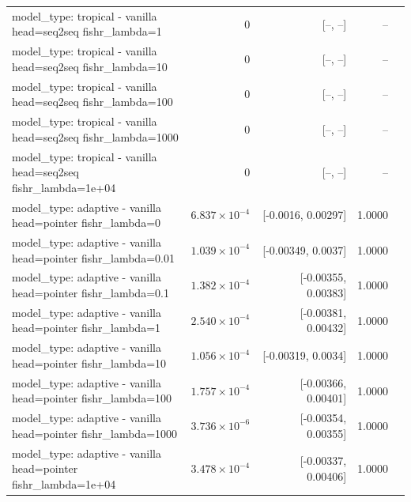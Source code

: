 \documentclass[10pt]{article}
\makeatletter
\newcommand{\stackcell}[1]{\begin{tabular}[t]{@{}l@{}}#1\end{tabular}}
\makeatother
\begin{document}
{\begin{longtable}{lrrrl}
\stackcell{model\_type: tropical - vanilla\\\footnotesize head=seq2seq fishr\_lambda=1 } & 0 & [--, --] & -- & \\
\stackcell{model\_type: tropical - vanilla\\\footnotesize head=seq2seq fishr\_lambda=10 } & 0 & [--, --] & -- & \\
\stackcell{model\_type: tropical - vanilla\\\footnotesize head=seq2seq fishr\_lambda=100 } & 0 & [--, --] & -- & \\
\stackcell{model\_type: tropical - vanilla\\\footnotesize head=seq2seq fishr\_lambda=1000 } & 0 & [--, --] & -- & \\
\stackcell{model\_type: tropical - vanilla\\\footnotesize head=seq2seq fishr\_lambda=1e+04 } & 0 & [--, --] & -- & \\
\stackcell{model\_type: adaptive - vanilla\\\footnotesize head=pointer fishr\_lambda=0 } & $6.837\times10^{-4}$ & [-0.0016, 0.00297] & 1.0000 & \\
\stackcell{model\_type: adaptive - vanilla\\\footnotesize head=pointer fishr\_lambda=0.01 } & $1.039\times10^{-4}$ & [-0.00349, 0.0037] & 1.0000 & \\
\stackcell{model\_type: adaptive - vanilla\\\footnotesize head=pointer fishr\_lambda=0.1 } & $1.382\times10^{-4}$ & [-0.00355, 0.00383] & 1.0000 & \\
\stackcell{model\_type: adaptive - vanilla\\\footnotesize head=pointer fishr\_lambda=1 } & $2.540\times10^{-4}$ & [-0.00381, 0.00432] & 1.0000 & \\
\stackcell{model\_type: adaptive - vanilla\\\footnotesize head=pointer fishr\_lambda=10 } & $1.056\times10^{-4}$ & [-0.00319, 0.0034] & 1.0000 & \\
\stackcell{model\_type: adaptive - vanilla\\\footnotesize head=pointer fishr\_lambda=100 } & $1.757\times10^{-4}$ & [-0.00366, 0.00401] & 1.0000 & \\
\stackcell{model\_type: adaptive - vanilla\\\footnotesize head=pointer fishr\_lambda=1000 } & $3.736\times10^{-6}$ & [-0.00354, 0.00355] & 1.0000 & \\
\stackcell{model\_type: adaptive - vanilla\\\footnotesize head=pointer fishr\_lambda=1e+04 } & $3.478\times10^{-4}$ & [-0.00337, 0.00406] & 1.0000 & \\

\end{longtable}}
\end{document}
